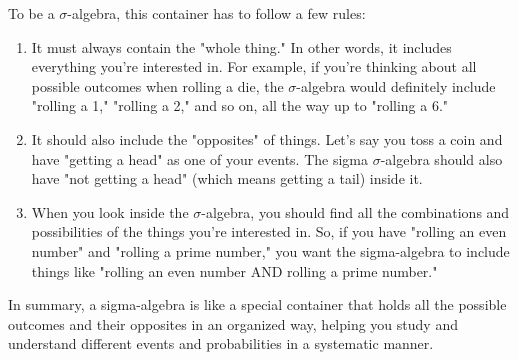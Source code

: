 \documentclass{tufte-handout}
\begin{document}
To be a $\sigma$-algebra, this container has to follow a few rules:

\begin{enumerate}

\item It must always contain the "whole thing." In other words, it includes everything you're interested in. For example, if you're thinking about all possible outcomes when rolling a die, the $\sigma$-algebra would definitely include "rolling a 1," "rolling a 2," and so on, all the way up to "rolling a 6."

\item It should also include the "opposites" of things. Let's say you toss a coin and have "getting a head" as one of your events. The sigma $\sigma$-algebra should also have "not getting a head" (which means getting a tail) inside it.

\item When you look inside the $\sigma$-algebra, you should find all the combinations and possibilities of the things you're interested in. So, if you have "rolling an even number" and "rolling a prime number," you want the sigma-algebra to include things like "rolling an even number AND rolling a prime number."
\end{enumerate}
In summary,  a sigma-algebra is like a special container that holds all the possible outcomes and their opposites in an  organized way, helping you study and understand different events and probabilities in a systematic manner. 
\end{document}
